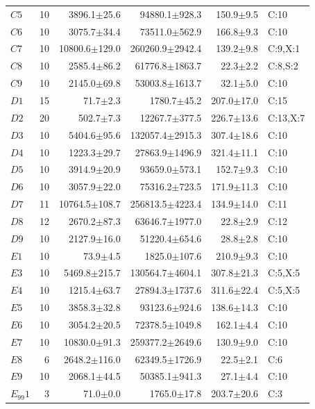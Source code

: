 \begin{supertabular}{@{}lrrrrl@{}}
$C5$ & 10 & 3896.1$\pm$25.6 & 94880.1$\pm$928.3 & 150.9$\pm$9.5 & C:10 \\
$C6$ & 10 & 3075.7$\pm$34.4 & 73511.0$\pm$562.9 & 166.8$\pm$9.3 & C:10 \\
$C7$ & 10 & 10800.6$\pm$129.0 & 260260.9$\pm$2942.4 & 139.2$\pm$9.8 & C:9,X:1 \\
$C8$ & 10 & 2585.4$\pm$86.2 & 61776.8$\pm$1863.7 & 22.3$\pm$2.2 & C:8,S:2 \\
$C9$ & 10 & 2145.0$\pm$69.8 & 53003.8$\pm$1613.7 & 32.1$\pm$5.0 & C:10 \\
$D1$ & 15 & 71.7$\pm$2.3 & 1780.7$\pm$45.2 & 207.0$\pm$17.0 & C:15 \\
$D2$ & 20 & 502.7$\pm$7.3 & 12267.7$\pm$377.5 & 226.7$\pm$13.6 & C:13,X:7 \\
$D3$ & 10 & 5404.6$\pm$95.6 & 132057.4$\pm$2915.3 & 307.4$\pm$18.6 & C:10 \\
$D4$ & 10 & 1223.3$\pm$29.7 & 27863.9$\pm$1496.9 & 321.4$\pm$11.1 & C:10 \\
$D5$ & 10 & 3914.9$\pm$20.9 & 93659.0$\pm$573.1 & 152.7$\pm$9.3 & C:10 \\
$D6$ & 10 & 3057.9$\pm$22.0 & 75316.2$\pm$723.5 & 171.9$\pm$11.3 & C:10 \\
$D7$ & 11 & 10764.5$\pm$108.7 & 256813.5$\pm$4223.4 & 134.9$\pm$14.0 & C:11 \\
$D8$ & 12 & 2670.2$\pm$87.3 & 63646.7$\pm$1977.0 & 22.8$\pm$2.9 & C:12 \\
$D9$ & 10 & 2127.9$\pm$16.0 & 51220.4$\pm$654.6 & 28.8$\pm$2.8 & C:10 \\
$E1$ & 10 & 73.9$\pm$4.5 & 1825.0$\pm$107.6 & 210.9$\pm$9.3 & C:10 \\
$E3$ & 10 & 5469.8$\pm$215.7 & 130564.7$\pm$4604.1 & 307.8$\pm$21.3 & C:5,X:5 \\
$E4$ & 10 & 1215.4$\pm$63.7 & 27894.3$\pm$1737.6 & 311.6$\pm$22.4 & C:5,X:5 \\
$E5$ & 10 & 3858.3$\pm$32.8 & 93123.6$\pm$924.6 & 138.6$\pm$14.3 & C:10 \\
$E6$ & 10 & 3054.2$\pm$20.5 & 72378.5$\pm$1049.8 & 162.1$\pm$4.4 & C:10 \\
$E7$ & 10 & 10830.0$\pm$91.3 & 259377.2$\pm$2649.6 & 130.9$\pm$9.0 & C:10 \\
$E8$ & 6 & 2648.2$\pm$116.0 & 62349.5$\pm$1726.9 & 22.5$\pm$2.1 & C:6 \\
$E9$ & 10 & 2068.1$\pm$44.5 & 50385.1$\pm$941.3 & 27.1$\pm$4.4 & C:10 \\
$E_{99}1$ & 3 & 71.0$\pm$0.0 & 1765.0$\pm$17.8 & 203.7$\pm$20.6 & C:3 \\

\end{supertabular}

